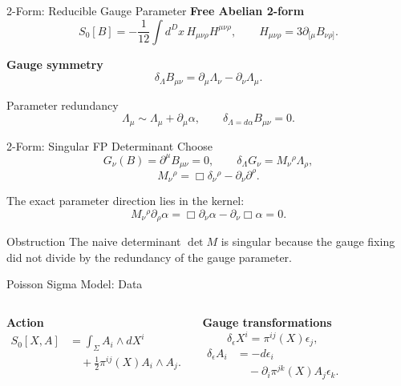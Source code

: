 \documentclass[aspectratio=169,professionalfonts]{beamer}
\newcommand{\sidehead}[1]{\textcolor{CourseTeal}{\textbf{#1}}}
\begin{document}
\begin{frame}{2-Form: Reducible Gauge Parameter}
  \sidehead{Free Abelian 2-form}
  \[
    S_0[B]=-\frac{1}{12}\int d^Dx\,H_{\mu\nu\rho}H^{\mu\nu\rho},
    \qquad
    H_{\mu\nu\rho}=3\partial_{[\mu}B_{\nu\rho]} .
  \]

  \sidehead{Gauge symmetry}
  \[
    \delta_\Lambda B_{\mu\nu}
    =\partial_\mu\Lambda_\nu-\partial_\nu\Lambda_\mu .
  \]

  \begin{block}{Parameter redundancy}
    \[
      \Lambda_\mu\sim\Lambda_\mu+\partial_\mu\alpha,
      \qquad
      \delta_{\Lambda=d\alpha}B_{\mu\nu}=0 .
    \]
  \end{block}
\end{frame}

\begin{frame}{2-Form: Singular FP Determinant}
  Choose
  \[
    G_\nu(B)=\partial^\mu B_{\mu\nu}=0,
    \qquad
    \delta_\Lambda G_\nu=M_\nu{}^\rho\Lambda_\rho ,
  \]
  \[
    M_\nu{}^\rho=\Box\delta_\nu{}^\rho-\partial_\nu\partial^\rho .
  \]

  The exact parameter direction lies in the kernel:
  \[
    M_\nu{}^\rho\partial_\rho\alpha
    =\Box\partial_\nu\alpha-\partial_\nu\Box\alpha=0 .
  \]

  \begin{alertblock}{Obstruction}
    The naive determinant $\det M$ is singular because the gauge fixing did not
    divide by the redundancy of the gauge parameter.
  \end{alertblock}
\end{frame}

\begin{frame}{Poisson Sigma Model: Data}
  \small
  \begin{columns}[T,onlytextwidth]

    \sidehead{Action}
    \[
      \begin{aligned}
        S_0[X,A]
        &=\int_\Sigma A_i\wedge dX^i\\
        &\quad+\frac12\pi^{ij}(X)A_i\wedge A_j .
      \end{aligned}
    \]

    \sidehead{Gauge transformations}
    \[
      \delta_\epsilon X^i=\pi^{ij}(X)\epsilon_j ,
    \]
    \[
      \begin{aligned}
        \delta_\epsilon A_i
        &=-d\epsilon_i\\
        &\quad-\partial_i\pi^{jk}(X)A_j\epsilon_k .
      \end{aligned}
    \]
  \end{columns}
\end{frame}
\end{document}
